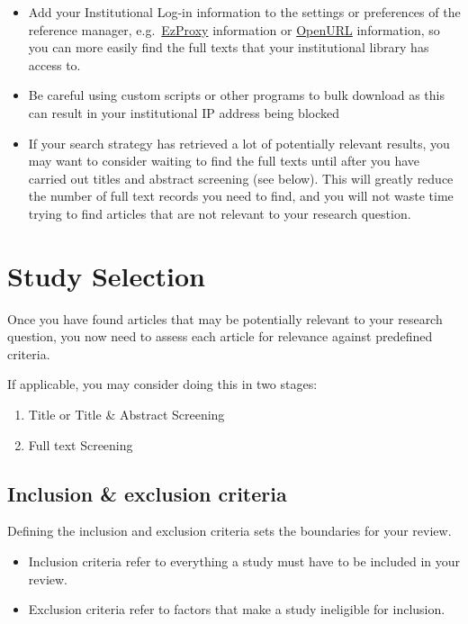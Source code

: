 \documentclass[
]{book}
\providecommand{\tightlist}{%
  \setlength{\itemsep}{0pt}\setlength{\parskip}{0pt}}
\begin{document}
\begin{itemize}
\tightlist
\item
  Add your Institutional Log-in information to the settings or preferences of the reference manager, e.g.~\href{https://ezproxy-db.appspot.com/}{EzProxy} information or \href{https://www.zotero.org/support/locate/openurl_resolvers}{OpenURL} information, so you can more easily find the full texts that your institutional library has access to.
\item
  Be careful using custom scripts or other programs to bulk download as this can result in your institutional IP address being blocked
\item
  If your search strategy has retrieved a lot of potentially relevant results, you may want to consider waiting to find the full texts until after you have carried out titles and abstract screening (see below). This will greatly reduce the number of full text records you need to find, and you will not waste time trying to find articles that are not relevant to your research question.
\end{itemize}

\hypertarget{study-selection}{%
\chapter{Study Selection}\label{study-selection}}

Once you have found articles that may be potentially relevant to your research question, you now need to assess each article for relevance against predefined criteria.

If applicable, you may consider doing this in two stages:

\begin{enumerate}
\def\labelenumi{\arabic{enumi}.}
\tightlist
\item
  Title or Title \& Abstract Screening
\item
  Full text Screening
\end{enumerate}

\hypertarget{inclusion-exclusion-criteria}{%
\section{Inclusion \& exclusion criteria}\label{inclusion-exclusion-criteria}}

Defining the inclusion and exclusion criteria sets the boundaries for your review.

\begin{itemize}
\tightlist
\item
  Inclusion criteria refer to everything a study must have to be included in your review.
\item
  Exclusion criteria refer to factors that make a study ineligible for inclusion.
\end{itemize}
\end{document}

